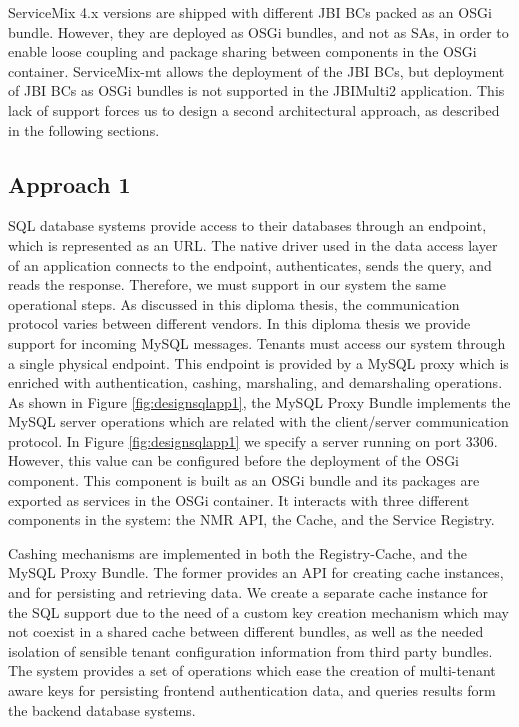 ServiceMix 4.x versions are shipped with different \ac{JBI} \ac{BC}s packed as an \ac{OSGi} bundle. However, they are deployed as \ac{OSGi} bundles, and not as \ac{SA}s, in order to enable loose coupling and package sharing between components in the \ac{OSGi} container. ServiceMix-mt allows the deployment of the \ac{JBI} \ac{BC}s, but deployment of \ac{JBI} \ac{BC}s as OSGi bundles is not supported in the JBIMulti2 application. This lack of support forces us to design a second architectural approach, as described in the following sections.

\FloatBarrier

\subsection{Approach 1}

\ac{SQL} database systems provide access to their databases through an endpoint, which is represented as an URL. The native driver used in the data access layer of an application connects to the endpoint, authenticates, sends the query, and reads the response. Therefore, we must support in our system the same operational steps. As discussed in this diploma thesis, the communication protocol varies between different vendors. In this diploma thesis we provide support for incoming MySQL messages. Tenants must access our system through a single physical endpoint. This endpoint is provided by a MySQL proxy which is enriched with authentication, cashing, marshaling, and demarshaling operations. As shown in Figure \ref{fig:designsqlapp1}, the MySQL Proxy Bundle implements the MySQL server operations which are related with the client/server communication protocol. In Figure \ref{fig:designsqlapp1} we specify a server running on port 3306. However, this value can be configured before the deployment of the \ac{OSGi} component. This component is built as an \ac{OSGi} bundle and its packages are exported as services in the \ac{OSGi} container. It interacts with three different components in the system: the \ac{NMR} \ac{API}, the Cache, and the Service Registry. 

Cashing mechanisms are implemented in both the Registry-Cache, and the MySQL Proxy Bundle. The former provides an \ac{API} for creating cache instances, and for persisting and retrieving data. We create a separate cache instance for the \ac{SQL} support due to the need of a custom key creation mechanism which may not coexist in a shared cache between different bundles, as well as the needed isolation of sensible tenant configuration information from third party bundles. The system provides a set of operations which ease the creation of multi-tenant aware keys for persisting frontend authentication data, and queries results form the backend database systems. 

